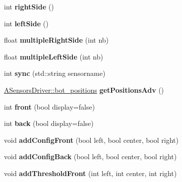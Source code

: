 \begin{DoxyCompactItemize}
\mbox{\label{classSensors_a6f91528b57a31690c61f03503ee180d5}} 
int {\bfseries right\+Side} ()
\item 
\mbox{\label{classSensors_a298faac37527e7e0aa16658acb2b3e41}} 
int {\bfseries left\+Side} ()
\item 
\mbox{\label{classSensors_ac64cdee4463d5580cbfca8e0aa8a6e70}} 
float {\bfseries multiple\+Right\+Side} (int nb)
\item 
\mbox{\label{classSensors_a1742695dacc4c683f7a6136b650c0aa7}} 
float {\bfseries multiple\+Left\+Side} (int nb)
\item 
\mbox{\label{classSensors_a33a5aa7e06b72aa392c3e9e1931c6d0b}} 
int {\bfseries sync} (std\+::string sensorname)
\item 
\mbox{\label{classSensors_a8ee8441fd89b38ccf045e74e5b6051bb}} 
\hyperlink{classASensorsDriver_a9743a29ef7d4faebd915f096f07bf729}{A\+Sensors\+Driver\+::bot\+\_\+positions} {\bfseries get\+Positions\+Adv} ()
\item 
\mbox{\label{classSensors_a6fde663a7fb649742b32c4c56e4b939c}} 
int {\bfseries front} (bool display=false)
\item 
\mbox{\label{classSensors_a7c1612f78d78562aa12322638a74140f}} 
int {\bfseries back} (bool display=false)
\item 
\mbox{\label{classSensors_a9acfbca790ff87f9c7aeb9eb35dc8a47}} 
void {\bfseries add\+Config\+Front} (bool left, bool center, bool right)
\item 
\mbox{\label{classSensors_ae13b733f9e964be1dd6fc9ff93b59f7b}} 
void {\bfseries add\+Config\+Back} (bool left, bool center, bool right)
\item 
\mbox{\label{classSensors_ad47b232a04891091fe9776339cb40013}} 
void {\bfseries add\+Threshold\+Front} (int left, int center, int right)
\item 
\mbox{\label{classSensors_a9f6b2a9f9f19ef01807a74b87f2e808f}} 

\end{DoxyCompactItemize}
